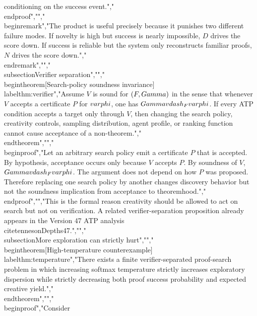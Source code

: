 {{{conditioning on the success event.","\\end{proof}","","\\begin{remark}","The product is useful precisely because it punishes two different failure modes. If novelty is high but success is nearly impossible, $D$ drives the score down. If success is reliable but the system only reconstructs familiar proofs, $N$ drives the score down.","\\end{remark}","","\\subsection{Verifier separation}","","\\begin{theorem}[Search-policy soundness invariance]\\label{thm:verifier}","Assume $V$ is sound for $(F,\\Gamma)$ in the sense that whenever $V$ accepts a certificate $P$ for $\\varphi$, one has $\\Gamma\\vdash_F\\varphi$. If every ATP condition accepts a target only through $V$, then changing the search policy, creativity controls, sampling distribution, agent profile, or ranking function cannot cause acceptance of a non-theorem.","\\end{theorem}","","\\begin{proof}","Let an arbitrary search policy emit a certificate $P$ that is accepted. By hypothesis, acceptance occurs only because $V$ accepts $P$. By soundness of $V$, $\\Gamma\\vdash_F\\varphi$. The argument does not depend on how $P$ was proposed. Therefore replacing one search policy by another changes discovery behavior but not the soundness implication from acceptance to theoremhood.","\\end{proof}","","This is the formal reason creativity should be allowed to act on search but not on verification. A related verifier-separation proposition already appears in the Version 47 ATP analysis \\cite{tennesonDepths47}.","","\\subsection{More exploration can strictly hurt}","","\\begin{theorem}[High-temperature counterexample]\\label{thm:temperature}","There exists a finite verifier-separated proof-search problem in which increasing softmax temperature strictly increases exploratory dispersion while strictly decreasing both proof success probability and expected creative yield.","\\end{theorem}","","\\begin{proof}","Consider }}}
